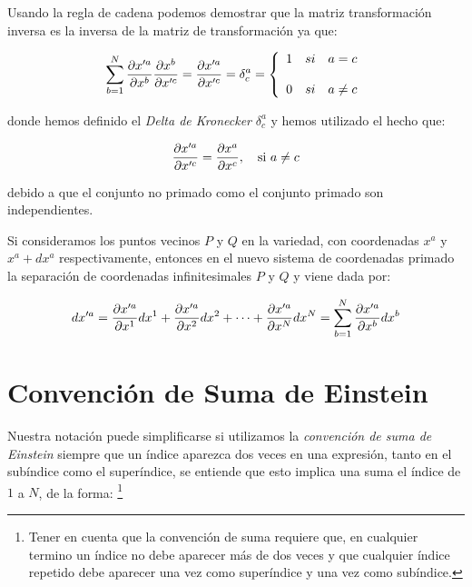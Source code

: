 \documentclass[../main]{subfiles}
\begin{document}
\vspace{0.2cm}
Usando la regla de cadena podemos demostrar que la matriz transformación inversa es la inversa de la matriz de transformación ya que:

\begin{equation}
    \sum_{b=1}^N \pdv{x'^a}{x^b} \pdv{x^b}{x'^c}=\pdv{x'^a}{x'^c}= \delta_c^a=
    \left\{ \begin{array}{lcc}
             1 &   si  & a=c \\
             \\ 0 &  si & a\neq c \\
             \end{array}
   \right.
\end{equation}

donde hemos definido el \textit{Delta de Kronecker} $\delta_c^a$ y hemos utilizado el hecho que:

\begin{equation}
    \pdv{x'^a}{x'^c}=\pdv{x^a}{x^c}, \quad \text{si} \ a\neq c
\end{equation}

debido a que el conjunto no primado como el conjunto primado son independientes.

\vspace{0.2cm}

Si consideramos los puntos vecinos $P$ y $Q$ en la variedad, con coordenadas $x^a$ y $x^a + dx^a$ respectivamente, entonces en el nuevo sistema de coordenadas primado la separación de coordenadas infinitesimales $P$ y $Q$ y viene dada por:

\begin{equation}
    dx'^a=\pdv{x'^a}{x^1}dx^1+\pdv{x'^a}{x^2}dx^2+ \cdots + \pdv{x'^a}{x^N}dx^N=\sum_{b=1}^N \pdv{x'^a}{x^b}dx^b
\end{equation}

\section{Convención de Suma de Einstein}

Nuestra notación puede simplificarse si utilizamos la \textit{convención de suma de Einstein} siempre que un índice aparezca dos veces en una expresión, tanto en el subíndice como el superíndice, se entiende que esto implica una suma el índice de $1$ a $N$, de la forma: \footnote{Tener en cuenta que la convención de suma requiere que, en cualquier termino un índice no debe aparecer más de dos veces y que cualquier índice repetido debe aparecer una vez como superíndice y una vez como subíndice.}
\end{document}
